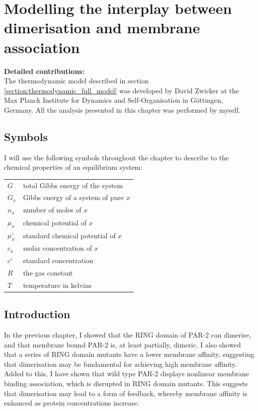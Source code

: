 \documentclass[12pt]{"report"}
\begin{document}
\clearpage
\chapter{Modelling the interplay between dimerisation and membrane association}

\textbf{Detailed contributions:}\\
The thermodynamic model described in section \ref{section:thermodynamic_full_model} was developed by David Zwicker at the Max Planck Institute for Dynamics and Self-Organisation in G{\"o}ttingen, Germany. All the analysis presented in this chapter was performed by myself.\\

\clearpage
\section*{Symbols}

I will use the following symbols throughout the chapter to describe to the chemical properties of an equilibrium system:\\

\begin{tabular}{ll}
$G$ & total Gibbs energy of the system\\
$G_x$ & Gibbs energy of a system of pure $x$\\
$n_x$ & number of moles of $x$\\
$\mu_x$ & chemical potential of $x$\\
$\mu_x^{\circ}$ & standard chemical potential of $x$\\
$c_x$ & molar concentration of $x$\\
$c^{\circ}$ & standard concentration\\
$R$ & the gas constant\\
$T$ & temperature in kelvins
\end{tabular}


\clearpage
\section{Introduction}

In the previous chapter, I showed that the RING domain of PAR-2 can dimerise, and that membrane bound PAR-2 is, at least partially, dimeric. I also showed that a series of RING domain mutants have a lower membrane affinity, suggesting that dimerisation may be fundamental for achieving high membrane affinity. Added to this, I have shown that wild type PAR-2 displays nonlinear membrane binding association, which is disrupted in RING domain mutants. This suggests that dimerisation may lead to a form of feedback, whereby membrane affinity is enhanced as protein concentrations increase.\\
\end{document}
